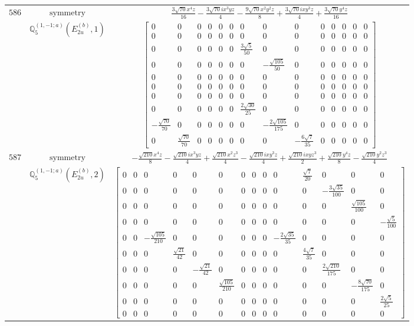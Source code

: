 \documentclass[fleqn,8pt,landscape]{jsarticle}
\begin{document}
\begin{longtable}{ccc}
$ 586 $ & $ \text{symmetry} $ & $ \frac{3 \sqrt{70} x^{4} z}{16} - \frac{3 \sqrt{70} i x^{3} y z}{4} - \frac{9 \sqrt{70} x^{2} y^{2} z}{8} + \frac{3 \sqrt{70} i x y^{3} z}{4} + \frac{3 \sqrt{70} y^{4} z}{16} $ \\
$  $ & $ \mathbb{Q}_{5}^{(1,-1;a)}(E_{2u}^{(b)},1) $ & $ \begin{bmatrix} 0 & 0 & 0 & 0 & 0 & 0 & 0 & 0 & 0 & 0 & 0 & 0 & 0 & 0 \\ 0 & 0 & 0 & 0 & 0 & 0 & 0 & 0 & 0 & 0 & 0 & 0 & 0 & 0 \\ 0 & 0 & 0 & 0 & 0 & 0 & \frac{3 \sqrt{5}}{50} & 0 & 0 & 0 & 0 & 0 & 0 & 0 \\ 0 & 0 & 0 & 0 & 0 & 0 & 0 & - \frac{\sqrt{105}}{50} & 0 & 0 & 0 & 0 & 0 & 0 \\ 0 & 0 & 0 & 0 & 0 & 0 & 0 & 0 & 0 & 0 & 0 & 0 & 0 & 0 \\ 0 & 0 & 0 & 0 & 0 & 0 & 0 & 0 & 0 & 0 & 0 & 0 & 0 & 0 \\ 0 & 0 & 0 & 0 & 0 & 0 & 0 & 0 & 0 & 0 & 0 & 0 & 0 & 0 \\ 0 & 0 & 0 & 0 & 0 & 0 & \frac{2 \sqrt{30}}{25} & 0 & 0 & 0 & 0 & 0 & 0 & 0 \\ - \frac{\sqrt{70}}{70} & 0 & 0 & 0 & 0 & 0 & 0 & - \frac{2 \sqrt{105}}{175} & 0 & 0 & 0 & 0 & 0 & 0 \\ 0 & \frac{\sqrt{70}}{70} & 0 & 0 & 0 & 0 & 0 & 0 & - \frac{6 \sqrt{7}}{35} & 0 & 0 & 0 & 0 & 0 \end{bmatrix} $ \\ \hline
$ 587 $ & $ \text{symmetry} $ & $ - \frac{\sqrt{210} x^{4} z}{8} - \frac{\sqrt{210} i x^{3} y z}{4} + \frac{\sqrt{210} x^{2} z^{3}}{4} - \frac{\sqrt{210} i x y^{3} z}{4} + \frac{\sqrt{210} i x y z^{3}}{2} + \frac{\sqrt{210} y^{4} z}{8} - \frac{\sqrt{210} y^{2} z^{3}}{4} $ \\
$  $ & $ \mathbb{Q}_{5}^{(1,-1;a)}(E_{2u}^{(b)},2) $ & $ \begin{bmatrix} 0 & 0 & 0 & 0 & 0 & 0 & 0 & 0 & 0 & 0 & \frac{\sqrt{7}}{20} & 0 & 0 & 0 \\ 0 & 0 & 0 & 0 & 0 & 0 & 0 & 0 & 0 & 0 & 0 & - \frac{3 \sqrt{35}}{100} & 0 & 0 \\ 0 & 0 & 0 & 0 & 0 & 0 & 0 & 0 & 0 & 0 & 0 & 0 & \frac{\sqrt{105}}{100} & 0 \\ 0 & 0 & 0 & 0 & 0 & 0 & 0 & 0 & 0 & 0 & 0 & 0 & 0 & - \frac{\sqrt{5}}{100} \\ 0 & 0 & - \frac{\sqrt{105}}{210} & 0 & 0 & 0 & 0 & 0 & 0 & - \frac{2 \sqrt{35}}{35} & 0 & 0 & 0 & 0 \\ 0 & 0 & 0 & \frac{\sqrt{21}}{42} & 0 & 0 & 0 & 0 & 0 & 0 & \frac{4 \sqrt{7}}{35} & 0 & 0 & 0 \\ 0 & 0 & 0 & 0 & - \frac{\sqrt{21}}{42} & 0 & 0 & 0 & 0 & 0 & 0 & \frac{2 \sqrt{210}}{175} & 0 & 0 \\ 0 & 0 & 0 & 0 & 0 & \frac{\sqrt{105}}{210} & 0 & 0 & 0 & 0 & 0 & 0 & - \frac{8 \sqrt{70}}{175} & 0 \\ 0 & 0 & 0 & 0 & 0 & 0 & 0 & 0 & 0 & 0 & 0 & 0 & 0 & \frac{2 \sqrt{5}}{25} \\ 0 & 0 & 0 & 0 & 0 & 0 & 0 & 0 & 0 & 0 & 0 & 0 & 0 & 0 \end{bmatrix} $ \\ \hline

\end{longtable}
\end{document}
